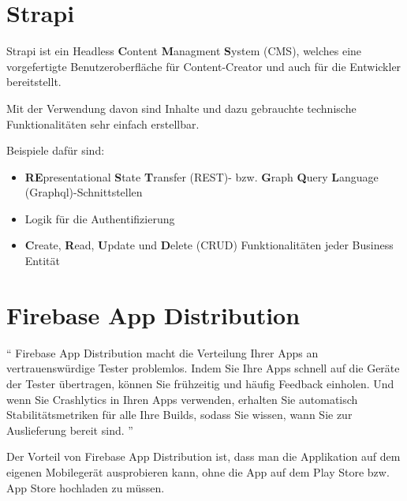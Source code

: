 \section{Strapi}
Strapi ist ein Headless \textbf{C}ontent \textbf{M}anagment \textbf{S}ystem (CMS),
welches eine vorgefertigte Benutzeroberfläche für Content-Creator
und auch für die Entwickler bereitstellt.

Mit der Verwendung davon sind Inhalte und dazu gebrauchte technische Funktionalitäten
sehr einfach erstellbar.
\cite{strapi-vs-wordpress}

Beispiele dafür sind:

\begin{itemize}
    \item \textbf{RE}presentational \textbf{S}tate \textbf{T}ransfer (REST)- bzw. \textbf{G}raph \textbf{Q}uery \textbf{L}anguage (Graphql)-Schnittstellen
    \item Logik für die Authentifizierung
    \item \textbf{C}reate, \textbf{R}ead, \textbf{U}pdate und \textbf{D}elete (CRUD)
          Funktionalitäten jeder Business Entität
\end{itemize}


\section{Firebase App Distribution}

``
Firebase App Distribution macht die Verteilung
Ihrer Apps an vertrauenswürdige Tester problemlos. Indem Sie Ihre Apps schnell
auf die Geräte der Tester übertragen, können Sie frühzeitig und häufig
Feedback einholen.
Und wenn Sie Crashlytics in Ihren Apps verwenden, erhalten Sie automatisch Stabilitätsmetriken für alle Ihre Builds, sodass Sie wissen, wann Sie zur Auslieferung bereit sind.
''\cite{fire-base-app-distribution}

Der Vorteil von Firebase App Distribution ist,
dass man die Applikation auf dem eigenen Mobilegerät ausprobieren kann,
ohne die App auf dem Play Store bzw. App Store hochladen zu müssen.